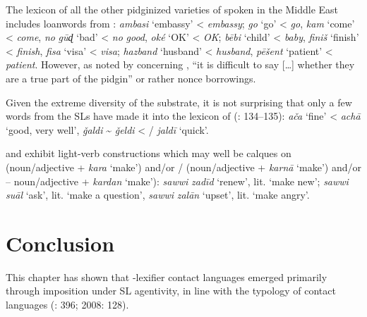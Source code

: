 \documentclass[output=paper]{langsci/langscibook}
\begin{document}
  The lexicon of all the other pidginized varieties of  spoken in the Middle East includes {loanwords} from :  \textit{ambasi} `embassy' <  \textit{embassy}; \textit{go} `go' <  \textit{go}, \textit{kam} `come' <  \textit{come}, \textit{no} \textit{gūɖ} ‘bad’ <  \textit{no} \textit{good}, \textit{oké} `OK' <  \textit{OK};   \textit{bēbi} ‘child’ <  \textit{baby}, \textit{finiš} ‘finish’ <  \textit{finish}, \textit{fisa} ‘visa’ <  \textit{visa};  \textit{hazband} `husband' <  \textit{husband}, \textit{pēšent} ‘patient’ <  \textit{patient}. However, as noted by \citet[113]{Smart1990} concerning , “it is difficult to say […] whether they are a true part of the {pidgin}” or rather nonce borrowings.  

Given the extreme diversity of the {substrate}, it is not surprising that only a few words from the SLs have made it into the lexicon of  (\citealt{Avram2017article}: 134–135): \textit{ača} ‘fine’ <  \textit{achā} ‘good, very well’, \textit{ǧaldi} {\textasciitilde}  \textit{ǧeldi} < / \textit{jaldī} ‘quick’. 

  and  exhibit light-verb constructions which may well be calques on  (noun/adjective + \textit{kara} ‘make’) and\slash or / (noun/adjective + \textit{karnā} ‘make’) and/or  – noun/adjective + \textit{kardan} ‘make’):   \textit{sawwi} \textit{zadīd} ‘renew’, lit. ‘make new’;  \textit{sawwi} \textit{suāl} ‘ask’, lit. ‘make a question’, \textit{sawwi} \textit{zalān} ‘upset’, lit. ‘make angry’. 

\section{Conclusion}\label{sec:conc}

This chapter has shown that -{lexifier} contact languages emerged primarily through {imposition} under {SL} agentivity, in line with the typology of contact languages (\citealt{Winford2005}: 396; 2008: 128). 
\end{document}
